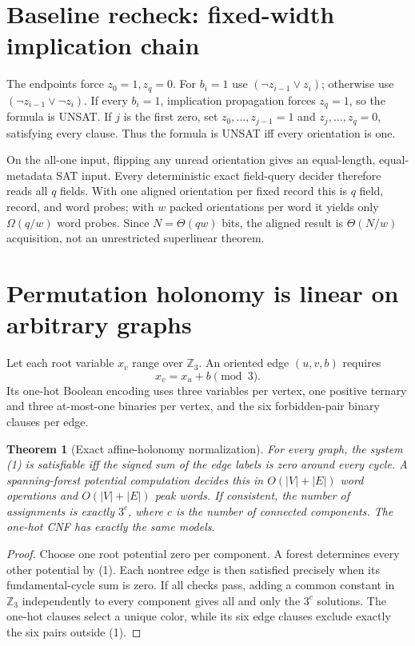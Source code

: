 \documentclass[11pt]{article}
\newtheorem{theorem}{Theorem}
\begin{document}
\section{Baseline recheck: fixed-width implication chain}

The endpoints force $z_0=1,z_q=0$.  For $b_i=1$ use
$(\neg z_{i-1}\vee z_i)$; otherwise use
$(\neg z_{i-1}\vee\neg z_i)$.  If every $b_i=1$, implication propagation
forces $z_q=1$, so the formula is UNSAT.  If $j$ is the first zero, set
$z_0,\ldots,z_{j-1}=1$ and $z_j,\ldots,z_q=0$, satisfying every clause.
Thus the formula is UNSAT iff every orientation is one.

On the all-one input, flipping any unread orientation gives an equal-length,
equal-metadata SAT input.  Every deterministic exact field-query decider
therefore reads all $q$ fields.  With one aligned orientation per fixed record
this is $q$ field, record, and word probes; with $w$ packed orientations per
word it yields only $\Omega(q/w)$ word probes.  Since
$N=\Theta(qw)$ bits, the aligned result is $\Theta(N/w)$ acquisition, not an
unrestricted superlinear theorem.

\section{Permutation holonomy is linear on arbitrary graphs}

Let each root variable $x_v$ range over $\mathbb Z_3$.  An oriented edge
$(u,v,b)$ requires
\[
x_v=x_u+b\pmod 3.
\tag{1}
\]
Its one-hot Boolean encoding uses three variables per vertex, one positive
ternary and three at-most-one binaries per vertex, and the six forbidden-pair
binary clauses per edge.

\begin{theorem}[Exact affine-holonomy normalization]
For every graph, the system (1) is satisfiable iff the signed sum of the edge
labels is zero around every cycle.  A spanning-forest potential computation
decides this in $O(|V|+|E|)$ word operations and $O(|V|+|E|)$ peak words.
If consistent, the number of assignments is exactly $3^c$, where $c$ is the
number of connected components.  The one-hot CNF has exactly the same models.
\end{theorem}
\begin{proof}
Choose one root potential zero per component.  A forest determines every
other potential by (1).  Each nontree edge is then satisfied precisely when
its fundamental-cycle sum is zero.  If all checks pass, adding a common
constant in $\mathbb Z_3$ independently to every component gives all and only
the $3^c$ solutions.  The one-hot clauses select a unique color, while its six
edge clauses exclude exactly the six pairs outside (1).
\end{proof}
\end{document}
